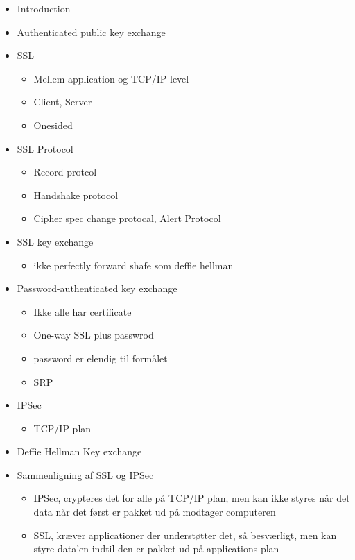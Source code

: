\documentclass[paper=a4, fontsize=11pt]{scrartcl} %
\numberwithin{equation}{section} %
\numberwithin{figure}{section} %
\numberwithin{table}{section} %
\begin{document}
	\begin{itemize}
		\item Introduction
		\item Authenticated public key exchange
		\item SSL
		\begin{itemize}
			\item Mellem application og TCP/IP level
			\item Client, Server
			\item Onesided
		\end{itemize}
		\item SSL Protocol
		\begin{itemize}
			\item Record protcol
			\item Handshake protocol
			\item Cipher spec change protocal, Alert Protocol
		\end{itemize}
		\item SSL key exchange
		\begin{itemize}
			\item ikke perfectly forward shafe som deffie hellman
		\end{itemize}
		\item Password-authenticated key exchange
		\begin{itemize}
			\item Ikke alle har certificate
			\item One-way SSL plus passwrod
			\item password er elendig til formålet
			\item SRP
		\end{itemize}
		\item IPSec
		\begin{itemize}
			\item TCP/IP plan
		\end{itemize}
		\item Deffie Hellman Key exchange
		\item Sammenligning af SSL og IPSec
		\begin{itemize}
			\item IPSec, crypteres det for alle på TCP/IP plan, men kan ikke styres når det data når det først er pakket ud på modtager computeren
			\item SSL, kræver applicationer der understøtter det, så besværligt, men kan styre data'en indtil den er pakket ud på applications plan
		\end{itemize}
	\end{itemize}
\end{document}
